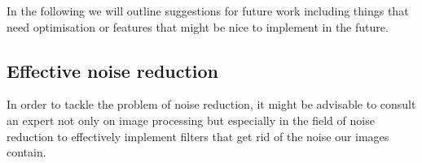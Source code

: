 In the following we will outline suggestions for future work including things that need optimisation or features that might be nice to implement in the future. 

%


\subsection{Effective noise reduction}

In order to tackle the problem of noise reduction, it might be advisable to consult an expert not only on image processing but especially in the field of noise reduction to effectively implement filters that get rid of the noise our images contain. 




